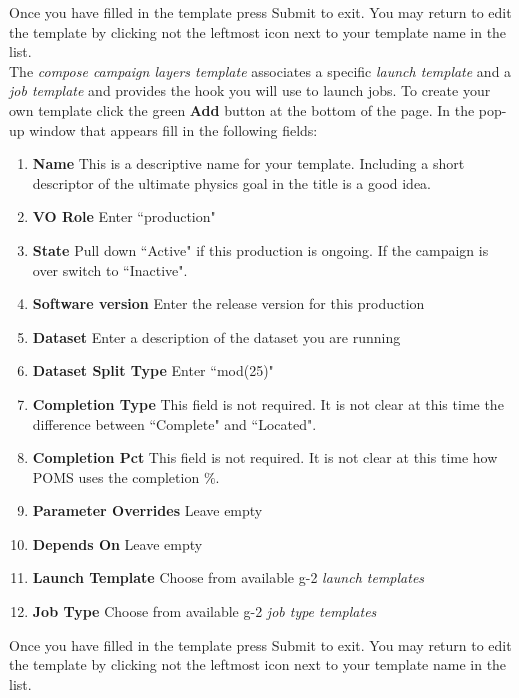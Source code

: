 \noindent Once you have filled in the template press Submit to exit. You may return to edit the template by clicking not the leftmost icon next to your template name in the list.\\

\noindent The {\it {compose campaign layers template}}  associates a specific {\it {launch template}} and a  {\it {job template}} and provides the hook you will use to launch jobs. To create your own template click the green {\bf Add} button at the bottom of the page. In the pop-up window that appears fill in the following fields:

\begin{enumerate}
\item[]{\bf{Name}} This is a descriptive name for your template. Including a short descriptor of the ultimate physics goal in the title is a good idea.
\item[]{\bf{VO Role}} Enter ``production"
\item[]{\bf{State}} Pull down ``Active" if this production is ongoing. If the campaign is over switch to ``Inactive".
\item[]{\bf{Software version}} Enter the release version for this production
\item[]{\bf{Dataset}} Enter a description of the dataset you are running
\item[]{\bf{Dataset Split Type}} Enter ``mod(25)"
\item[]{\bf{Completion Type}}  This field is not required. It is not clear at this time the difference between ``Complete" and ``Located".
\item[]{\bf{Completion Pct}} This field is not required. It is not clear at this time how POMS uses the completion $\%$.
\item[]{\bf{Parameter Overrides}} Leave empty
\item[]{\bf{Depends On}} Leave empty
\item[]{\bf{Launch Template}} Choose from available g-2 {\it {launch templates}}
\item[]{\bf{Job Type}} Choose from available g-2 {\it {job type templates}}
\end{enumerate}

\noindent Once you have filled in the template press Submit to exit. You may return to edit the template by clicking not the leftmost icon next to your template name in the list.\\

